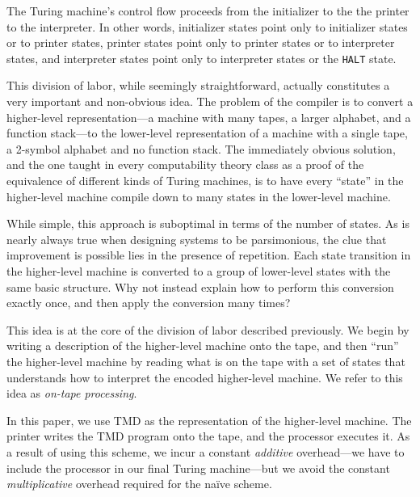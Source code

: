 \documentclass[11pt]{article}
\begin{document}
The Turing machine's control flow proceeds from the initializer to the the printer to the interpreter. In other words, initializer states point only to initializer states or to printer states, printer states point only to printer states or to interpreter states, and interpreter states point only to interpreter states or the \texttt{HALT} state. 

This division of labor, while seemingly straightforward, actually constitutes a very important and non-obvious idea. The problem of the compiler is to convert a higher-level representation---a machine with many tapes, a larger alphabet, and a function stack---to the lower-level representation of a machine with a single tape, a 2-symbol alphabet and no function stack. The immediately obvious solution, and the one taught in every computability theory class as a proof of the equivalence of different kinds of Turing machines, is to have every ``state'' in the higher-level machine compile down to many states in the lower-level machine. %

While simple, this approach is suboptimal in terms of the number of states. As is nearly always true when designing systems to be parsimonious, the clue that improvement is possible lies in the presence of repetition. Each state transition in the higher-level machine is converted to a group of lower-level states with the same basic structure. Why not instead explain how to perform this conversion exactly once, and then apply the conversion many times?

This idea is at the core of the division of labor described previously. We begin by writing a description of the higher-level machine onto the tape, and then ``run'' the higher-level machine by reading what is on the tape with a set of states that understands how to interpret the encoded higher-level machine. We refer to this idea as \emph{on-tape processing}.

In this paper, we use TMD as the representation of the higher-level machine.\footnotemark
{}
The printer writes the TMD program onto the tape, and the processor executes it. As a result of using this scheme, we incur a constant \emph{additive} overhead---we have to include the processor in our final Turing machine---but we avoid the constant \emph{multiplicative} overhead required for the na\"ive scheme. 
\end{document}
